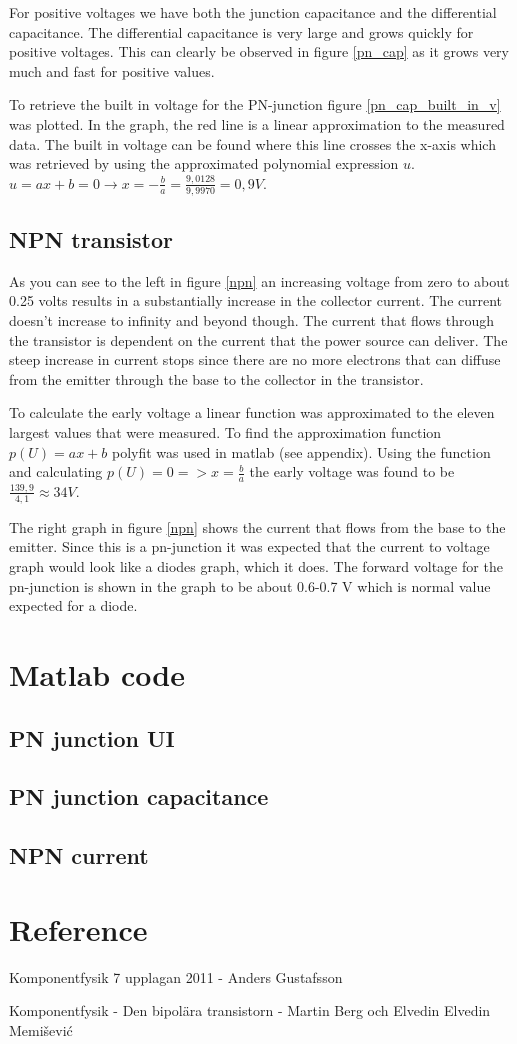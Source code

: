 \documentclass[a4paper]{article}
\begin{document}
For positive voltages we have both the junction capacitance and the differential capacitance. The differential capacitance is very large and grows quickly for positive voltages. This can clearly be observed in figure \ref{pn_cap} as it grows very much and fast for positive values.

To retrieve the built in voltage for the PN-junction figure \ref{pn_cap_built_in_v} was plotted. In the graph, the red line is a linear approximation to the measured data. The built in voltage can be found where this line crosses the x-axis which was retrieved by using the approximated polynomial expression $u$. $ u = ax + b = 0 \rightarrow x = -\frac{b}{a} = \frac{9,0128}{9,9970} = 0,9V$.

\subsection{NPN transistor}
As you can see to the left in figure \ref{npn} an increasing voltage from zero to about 0.25 volts results in a substantially increase in the collector current. The current doesn't increase to infinity and beyond though. The current that flows through the transistor is dependent on the current that the power source can deliver. The steep increase in current stops since there are no more electrons that can diffuse from the emitter through the base to the collector in the transistor.

To calculate the early voltage a linear function was approximated to the eleven largest values that were measured. To find the approximation function $p(U) = ax + b$ polyfit was used in matlab (see appendix). Using the function and calculating $p(U) = 0 => x = \frac{b}{a}$ the early voltage was found to be $\frac{139,9}{4,1} \approx 34V$.

The right graph in figure \ref{npn} shows the current that flows from the base to the emitter. Since this is a pn-junction it was expected that the current to voltage graph would look like a diodes graph, which it does. The forward voltage for the pn-junction is shown in the graph to be about 0.6-0.7 V which is normal value expected for a diode.

\newpage
\appendix
\section{Matlab code}
\subsection{PN junction UI}

\subsection{PN junction capacitance}

\subsection{NPN current}


\newpage
\section{Reference}
Komponentfysik  7 upplagan 2011 - Anders Gustafsson

Komponentfysik - Den bipolära transistorn - Martin Berg och Elvedin Elvedin Memišević
\end{document}
